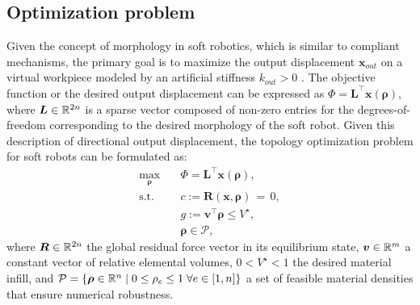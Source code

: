\subsection{Optimization problem}
Given the concept of morphology in soft robotics, which is similar to compliant mechanisms, the primary goal is to maximize the output displacement $\boldsymbol{x}_{out}$ on a virtual workpiece modeled by an artificial stiffness $k_{out} > 0$ \cite{Bendsoe2003,Gain2013Dec}. The objective function or the desired output displacement can be expressed as $\Phi = \boldsymbol{L}^\top\boldsymbol{x}(\boldsymbol{\rho})$, where $\boldsymbol{L} \in \mathbb{R}^{2n}$ is a sparse vector composed of non-zero entries for the degrees-of-freedom corresponding to the desired morphology of the soft robot. Given this description of directional output displacement, the topology optimization problem for soft robots can be formulated as:
\begin{equation}
\begin{aligned}
\max_{\boldsymbol{\rho}} \quad &  \Phi = \boldsymbol{L}^\top \boldsymbol{x}(\boldsymbol{\rho}), \\
\textrm{s.t.} \quad & c:=\boldsymbol{R}(\boldsymbol{x},\boldsymbol{\rho}) \,= \,0,\\
& g:=\boldsymbol{v}^\top \boldsymbol{\rho}  \le V^\star, \\
  &\boldsymbol{\rho} \in \mathcal{P},
  \label{eq:opt}
\end{aligned}
\end{equation}
where $\boldsymbol{R} \in \mathbb{R}^{2n}$ the global residual force vector in its equilibrium state, $\boldsymbol{v} \in \mathbb{R}^{m}$ a constant vector of relative elemental volumes, $ 0 < V^\star < 1$ the desired material infill, and $\mathcal{P} = \{\boldsymbol{\rho} \in \mathbb{R}^n \; | \; 0  \le \rho_e \le 1 \; \forall e \in [1,n] \}$ a set of feasible material densities that ensure numerical robustness.

